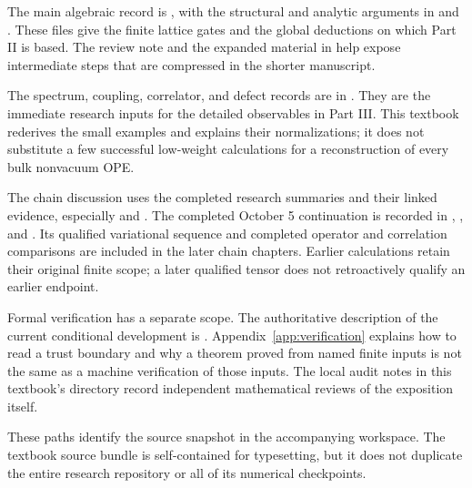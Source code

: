 The main algebraic record is
, with the structural and analytic
arguments in
 and
.
These files give the finite lattice gates and the global
deductions on which Part II is based. The review note
and the expanded material in
help expose intermediate steps that are compressed in the
shorter manuscript.

The spectrum, coupling, correlator, and defect records are in
. They are the immediate
research inputs for the detailed observables in Part III.
This textbook rederives the small examples and explains their
normalizations; it does not substitute a few successful
low-weight calculations for a reconstruction of every bulk
nonvacuum OPE.

The chain discussion uses the completed research summaries and
their linked evidence, especially
 and
.
The completed October 5 continuation is recorded in
,
, and
.
Its qualified variational sequence and completed operator and
correlation comparisons are included in the later chain chapters.
Earlier calculations retain their original finite scope; a later
qualified tensor does not retroactively qualify an earlier endpoint.

Formal verification has a separate scope. The authoritative
description of the current conditional development is
.
Appendix~\ref{app:verification} explains how to read a
trust boundary and why a theorem proved from named finite
inputs is not the same as a machine verification of those
inputs. The local audit notes in this textbook's
 directory record independent
mathematical reviews of the exposition itself.

These paths identify the source snapshot in the accompanying
workspace. The textbook source bundle is self-contained for
typesetting, but it does not duplicate the entire research
repository or all of its numerical checkpoints.
